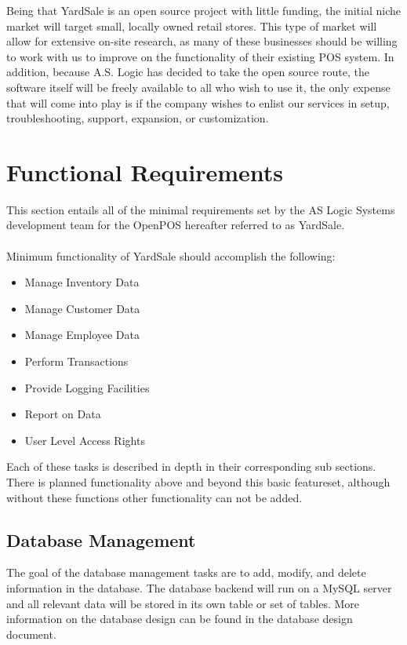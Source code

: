 \documentclass{report}
\begin{document}
Being that YardSale is an open source project with little funding,
the initial niche market will target small, locally owned retail
stores.  This type of market will allow for extensive on-site
research, as many of these businesses should be willing to work
with us to improve on the functionality of their existing POS
system.  In addition, because A.S. Logic has decided to take the
open source route, the software itself will be freely available to
all who wish to use it, the only expense that will come into play
is if the company wishes to enlist our services in setup,
troubleshooting, support, expansion, or customization.

\section{Functional Requirements}

This section entails all of the minimal requirements set by the AS
Logic Systems development team for the OpenPOS hereafter referred
to as YardSale.\\
\\Minimum functionality of YardSale should accomplish the
following:

\begin{itemize}
    \item {Manage Inventory Data}
    \item {Manage Customer Data}
    \item {Manage Employee Data}
    \item {Perform Transactions}
    \item {Provide Logging Facilities}
    \item {Report on Data}
    \item {User Level Access Rights}
\end{itemize}

Each of these tasks is described in depth in their corresponding
sub sections. There is planned functionality above and beyond this
basic featureset, although without these functions other
functionality can not be added.

    \subsection{Database Management}
    The goal of the database management tasks are to add, modify, and
    delete information in the database. The database backend will run
    on a MySQL server and all relevant data will be stored in its own
    table or set of tables. More information on the database design
    can be found in the database design document.
\end{document}
